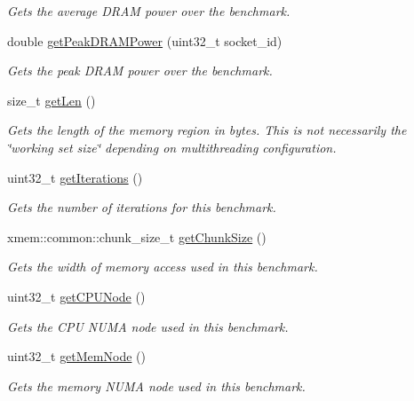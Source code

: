 \begin{DoxyCompactItemize}
\begin{DoxyCompactList}\small\item\em Gets the average D\+R\+A\+M power over the benchmark. \end{DoxyCompactList}\item 
double \hyperlink{classxmem_1_1benchmark_1_1_benchmark_a511908c2bd9bb5fa17d4b255a711636c}{get\+Peak\+D\+R\+A\+M\+Power} (uint32\+\_\+t socket\+\_\+id)
\begin{DoxyCompactList}\small\item\em Gets the peak D\+R\+A\+M power over the benchmark. \end{DoxyCompactList}\item 
size\+\_\+t \hyperlink{classxmem_1_1benchmark_1_1_benchmark_a3ca2577e4d2179710691c4aec7f93828}{get\+Len} ()
\begin{DoxyCompactList}\small\item\em Gets the length of the memory region in bytes. This is not necessarily the \char`\"{}working set size\char`\"{} depending on multithreading configuration. \end{DoxyCompactList}\item 
uint32\+\_\+t \hyperlink{classxmem_1_1benchmark_1_1_benchmark_a9fc7c775d0e29b22c8656e6e5bc10a48}{get\+Iterations} ()
\begin{DoxyCompactList}\small\item\em Gets the number of iterations for this benchmark. \end{DoxyCompactList}\item 
xmem\+::common\+::chunk\+\_\+size\+\_\+t \hyperlink{classxmem_1_1benchmark_1_1_benchmark_a434d6f97172982afdd16d3bde30e895f}{get\+Chunk\+Size} ()
\begin{DoxyCompactList}\small\item\em Gets the width of memory access used in this benchmark. \end{DoxyCompactList}\item 
uint32\+\_\+t \hyperlink{classxmem_1_1benchmark_1_1_benchmark_ad9e17919d6a8dd474495f3d7f0d05a29}{get\+C\+P\+U\+Node} ()
\begin{DoxyCompactList}\small\item\em Gets the C\+P\+U N\+U\+M\+A node used in this benchmark. \end{DoxyCompactList}\item 
uint32\+\_\+t \hyperlink{classxmem_1_1benchmark_1_1_benchmark_a35254c617874da5ccf8818692bdd0fe1}{get\+Mem\+Node} ()
\begin{DoxyCompactList}\small\item\em Gets the memory N\+U\+M\+A node used in this benchmark. \end{DoxyCompactList}\item 

\end{DoxyCompactItemize}
